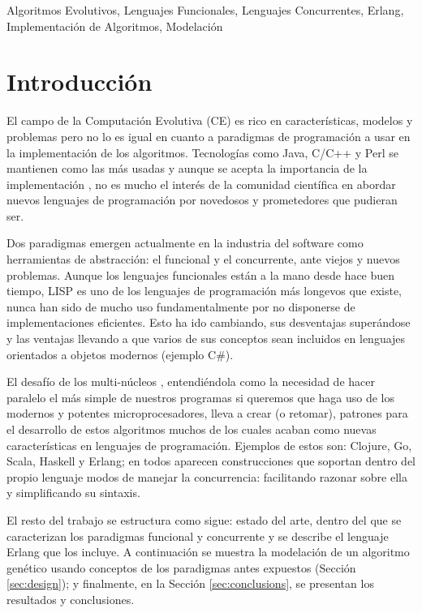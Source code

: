 \documentclass[runningheads]{llncs}
\newcommand{\keywords}[1]{\par\addvspace\baselineskip
\noindent\keywordname\enspace\ignorespaces#1}
\begin{document}
\keywords{Algoritmos Evolutivos, Lenguajes Funcionales, Lenguajes Concurrentes, Erlang, Implementación de Algoritmos, Modelación}

\section{Introducción}


\noindent El campo de la Computación Evolutiva (CE) es rico en características, modelos y problemas pero no lo es igual en cuanto a paradigmas de programación a usar en la implementación de los algoritmos. Tecnologías como Java, C/C++ y Perl se mantienen como las más usadas y aunque se acepta la importancia de la implementación \cite{DBLP:conf/iwann/MereloRACML11}, no es mucho el interés de la comunidad científica en abordar nuevos lenguajes de programación por novedosos y prometedores que pudieran ser.

Dos paradigmas emergen actualmente en la industria del software como herramientas de abstracción: el funcional y el concurrente, ante viejos y nuevos problemas. Aunque los lenguajes funcionales están a la mano desde hace buen tiempo, LISP es uno de los lenguajes de programación más longevos que existe, nunca han sido de mucho uso fundamentalmente por no disponerse de implementaciones eficientes. Esto ha ido cambiando, sus desventajas superándose y las ventajas llevando a que varios de sus conceptos sean incluidos en lenguajes orientados a objetos modernos (ejemplo C\#).

El desafío de los multi-núcleos \cite{SutterL05}, entendiéndola como la necesidad de hacer paralelo el más simple de nuestros programas si queremos que haga uso de los modernos y potentes microprocesadores, lleva a crear (o retomar), patrones para el desarrollo de estos algoritmos muchos de los cuales acaban como nuevas características en lenguajes de programación. Ejemplos de estos son: Clojure, Go, Scala, Haskell y Erlang; en todos aparecen construcciones que soportan dentro del propio lenguaje modos de manejar la concurrencia: facilitando razonar sobre ella y simplificando su sintaxis.

El resto del trabajo se estructura como sigue: estado del arte, dentro del que se caracterizan los paradigmas funcional y concurrente y se describe el lenguaje Erlang que los incluye. A continuación se muestra la modelación de un algoritmo genético usando conceptos de los paradigmas antes expuestos (Sección \ref{sec:design}); y finalmente, en la Sección \ref{sec:conclusions}, se presentan los resultados y conclusiones.
\end{document}

